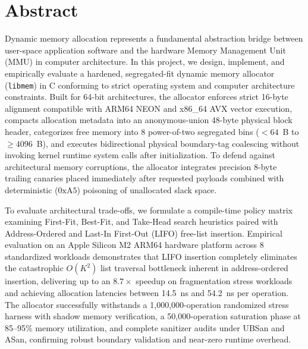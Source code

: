 \documentclass[a4paper,11pt]{report}
\begin{document}
\setcounter{page}{2}

\newpage
\chapter*{Abstract}

Dynamic memory allocation represents a fundamental abstraction bridge between user-space application software and the hardware Memory Management Unit (MMU) in computer architecture. In this project, we design, implement, and empirically evaluate a hardened, segregated-fit dynamic memory allocator (\texttt{libmem}) in C conforming to strict operating system and computer architecture constraints. Built for 64-bit architectures, the allocator enforces strict 16-byte alignment compatible with ARM64 NEON and x86\_64 AVX vector execution, compacts allocation metadata into an anonymous-union 48-byte physical block header, categorizes free memory into 8 power-of-two segregated bins ($<64$~B to $\ge 4096$~B), and executes bidirectional physical boundary-tag coalescing without invoking kernel runtime system calls after initialization. To defend against architectural memory corruptions, the allocator integrates precision 8-byte trailing canaries placed immediately after requested payloads combined with deterministic ($0\text{xA5}$) poisoning of unallocated slack space.

To evaluate architectural trade-offs, we formulate a compile-time policy matrix examining First-Fit, Best-Fit, and Take-Head search heuristics paired with Address-Ordered and Last-In First-Out (LIFO) free-list insertion. Empirical evaluation on an Apple Silicon M2 ARM64 hardware platform across 8 standardized workloads demonstrates that LIFO insertion completely eliminates the catastrophic $O(K^2)$ list traversal bottleneck inherent in address-ordered insertion, delivering up to an $8.7\times$ speedup on fragmentation stress workloads and achieving allocation latencies between 14.5~ns and 54.2~ns per operation. The allocator successfully withstands a 1,000,000-operation randomized stress harness with shadow memory verification, a 50,000-operation saturation phase at 85--95\% memory utilization, and complete sanitizer audits under UBSan and ASan, confirming robust boundary validation and near-zero runtime overhead.
\end{document}
